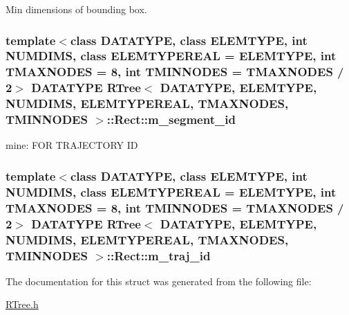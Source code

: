 Min dimensions of bounding box. 

\hypertarget{structRTree_1_1Rect_a36196729bcd01906974001af26423cb7}{
\subsubsection[{m\-\_\-segment\-\_\-id}]{\setlength{\rightskip}{0pt plus 5cm}template$<$class D\-A\-T\-A\-T\-Y\-P\-E, class E\-L\-E\-M\-T\-Y\-P\-E, int N\-U\-M\-D\-I\-M\-S, class E\-L\-E\-M\-T\-Y\-P\-E\-R\-E\-A\-L = E\-L\-E\-M\-T\-Y\-P\-E, int T\-M\-A\-X\-N\-O\-D\-E\-S = 8, int T\-M\-I\-N\-N\-O\-D\-E\-S = T\-M\-A\-X\-N\-O\-D\-E\-S / 2$>$ D\-A\-T\-A\-T\-Y\-P\-E {\bf R\-Tree}$<$ D\-A\-T\-A\-T\-Y\-P\-E, E\-L\-E\-M\-T\-Y\-P\-E, N\-U\-M\-D\-I\-M\-S, E\-L\-E\-M\-T\-Y\-P\-E\-R\-E\-A\-L, T\-M\-A\-X\-N\-O\-D\-E\-S, T\-M\-I\-N\-N\-O\-D\-E\-S $>$\-::Rect\-::m\-\_\-segment\-\_\-id}}\label{structRTree_1_1Rect_a36196729bcd01906974001af26423cb7}


mine\-: F\-O\-R T\-R\-A\-J\-E\-C\-T\-O\-R\-Y I\-D 

\hypertarget{structRTree_1_1Rect_ae30aa6041e1f115d9f779cc6f127f6f4}{
\subsubsection[{m\-\_\-traj\-\_\-id}]{\setlength{\rightskip}{0pt plus 5cm}template$<$class D\-A\-T\-A\-T\-Y\-P\-E, class E\-L\-E\-M\-T\-Y\-P\-E, int N\-U\-M\-D\-I\-M\-S, class E\-L\-E\-M\-T\-Y\-P\-E\-R\-E\-A\-L = E\-L\-E\-M\-T\-Y\-P\-E, int T\-M\-A\-X\-N\-O\-D\-E\-S = 8, int T\-M\-I\-N\-N\-O\-D\-E\-S = T\-M\-A\-X\-N\-O\-D\-E\-S / 2$>$ D\-A\-T\-A\-T\-Y\-P\-E {\bf R\-Tree}$<$ D\-A\-T\-A\-T\-Y\-P\-E, E\-L\-E\-M\-T\-Y\-P\-E, N\-U\-M\-D\-I\-M\-S, E\-L\-E\-M\-T\-Y\-P\-E\-R\-E\-A\-L, T\-M\-A\-X\-N\-O\-D\-E\-S, T\-M\-I\-N\-N\-O\-D\-E\-S $>$\-::Rect\-::m\-\_\-traj\-\_\-id}}\label{structRTree_1_1Rect_ae30aa6041e1f115d9f779cc6f127f6f4}


The documentation for this struct was generated from the following file\-:\begin{DoxyCompactItemize}
\item 
\hyperlink{RTree_8h}{R\-Tree.\-h}\end{DoxyCompactItemize}
